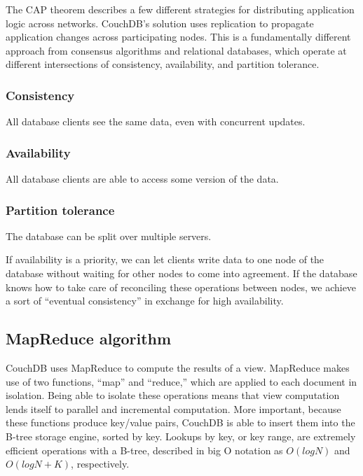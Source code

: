 The CAP theorem describes a few different strategies for distributing application 
logic across networks. CouchDB’s solution uses replication to propagate application 
changes across participating nodes. This is a fundamentally different approach from 
consensus algorithms and relational databases, which operate at different intersections 
of consistency, availability, and partition tolerance.

\subsubsection{Consistency}

All database clients see the same data, even with concurrent updates.

\subsubsection{Availability}

All database clients are able to access some version of the data.

\subsubsection{Partition tolerance}

The database can be split over multiple servers.

If availability is a priority, we can let clients write data to one node of the 
database without waiting for other nodes to come into agreement. If the database 
knows how to take care of reconciling these operations between nodes, we achieve 
a sort of “eventual consistency” in exchange for high availability.

\subsection{MapReduce algorithm}

CouchDB uses MapReduce to compute the results of a view. MapReduce makes use of two 
functions, “map” and “reduce,” which are applied to each document in isolation. 
Being able to isolate these operations means that view computation lends itself 
to parallel and incremental computation. More important, because these functions 
produce key/value pairs, CouchDB is able to insert them into the B-tree storage engine, 
sorted by key. Lookups by key, or key range, are extremely efficient operations with a 
B-tree, described in big O notation as $O(log N)$ and $O(log N + K)$, respectively.~\cite{CouchDB}
